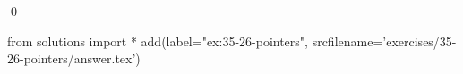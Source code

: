 
\begin{ex}
  \label{ex:35-26-pointers}
  
  \qed
\end{ex}
\begin{python0}
from solutions import *
add(label="ex:35-26-pointers",
    srcfilename='exercises/35-26-pointers/answer.tex')
\end{python0}
